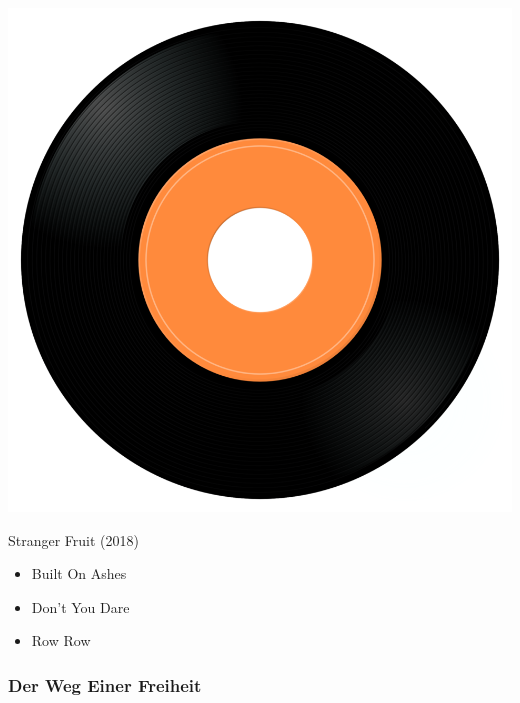\begin{minipage}[t]{0.25\textwidth}
\captionsetup{type=figure}
\includegraphics[width=\textwidth]{Images/cover.png}
\caption*{Stranger Fruit (2018)}
\end{minipage}
\begin{minipage}[t]{0.25\textwidth}\vspace{0pt}
\begin{itemize}[nosep,leftmargin=1em,labelwidth=*,align=left]
	\setlength{\itemsep}{0pt}
	\item Built On Ashes
	\item Don't You Dare
	\item Row Row
\end{itemize}
\end{minipage}

\subsubsection{Der Weg Einer Freiheit}

